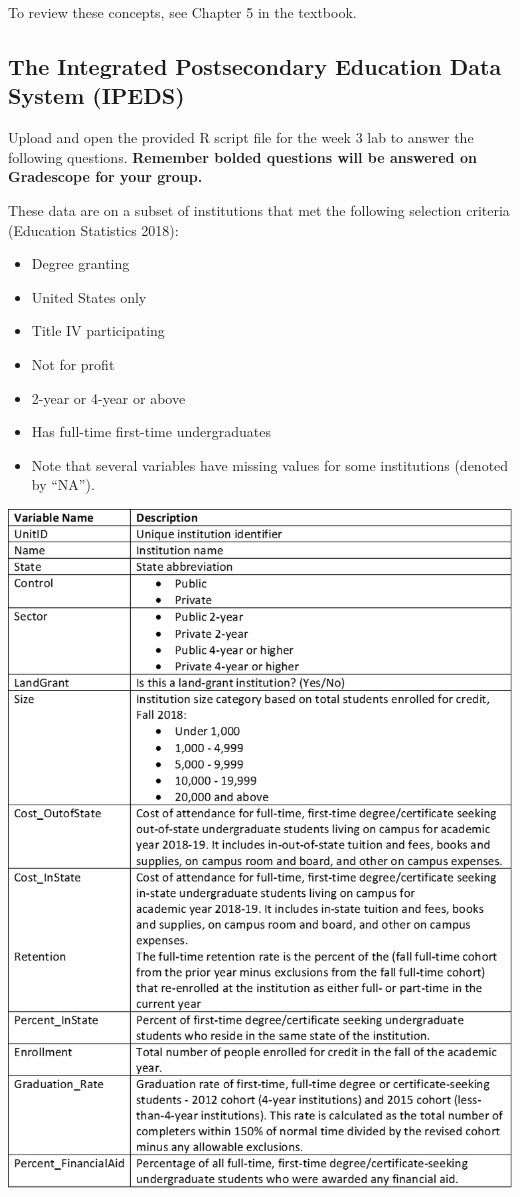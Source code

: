 \documentclass[
]{report}
\begin{document}
To review these concepts, see Chapter 5 in the textbook.

\hypertarget{the-integrated-postsecondary-education-data-system-ipeds}{%
\subsection{The Integrated Postsecondary Education Data System (IPEDS)}\label{the-integrated-postsecondary-education-data-system-ipeds}}

Upload and open the provided R script file for the week 3 lab to answer the following questions. \textbf{Remember bolded questions will be answered on Gradescope for your group.}

These data are on a subset of institutions that met the following selection criteria (Education Statistics 2018):

\begin{itemize}
\item
  Degree granting
\item
  United States only
\item
  Title IV participating
\item
  Not for profit
\item
  2-year or 4-year or above
\item
  Has full-time first-time undergraduates
\item
  Note that several variables have missing values for some institutions (denoted by ``NA'').
\end{itemize}

\begin{center}\includegraphics[width=0.75\linewidth]{images/IPEDS_Description} \end{center}
\end{document}
